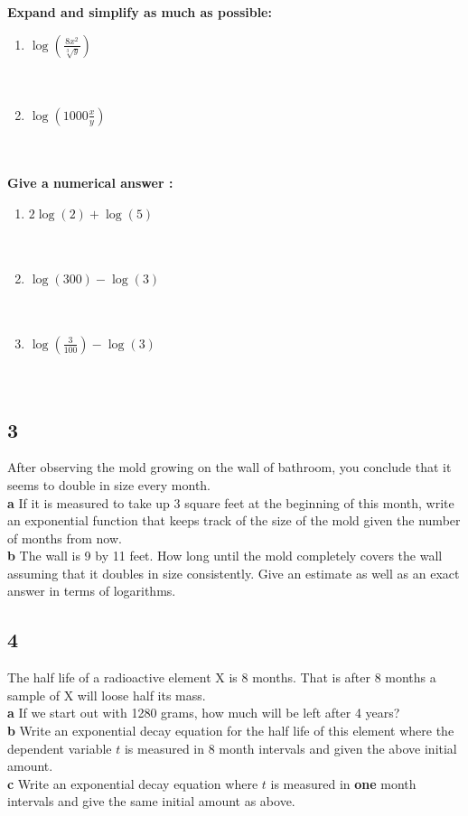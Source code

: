 \documentclass[11pt]{amsart}
\begin{document}
{\bf Expand and simplify as much as possible:} 
\begin{enumerate}[a]
\item $\displaystyle \log \left(\frac{8x^2}{\sqrt[3]{y}}\right) $\\ \\ \\
\item $\log(1000\frac{x}{y}) $ \\ \\ \\
\end{enumerate}

{\bf Give a numerical answer : } 
\begin{enumerate}[a]
\item $2\log(2) + \log(5) $\\ \\ \\
\item $\log(300) - \log( 3) $ \\ \\ \\ 
\item $\log(\frac{3}{100}) - \log(3) $ \\ \\ \\ 
\end{enumerate}




\newpage
\subsection*{3} %
After observing the mold growing on the wall of bathroom, you conclude that it seems to double in size every month.  \\
{\bf a} If it is measured to take up 3 square feet at the beginning of this month, write an exponential function that keeps track
of the size of the mold given the number of months from now. \\
{\bf b} The wall is 9 by 11 feet.  How long until the mold completely covers the wall assuming that it doubles in size consistently. 
Give an estimate as well as an exact answer in terms of logarithms. 
\vspace{7cm}
\newpage
\subsection*{4} %
The half life of a radioactive element X is 8 months. That is after 8 months a sample of X will loose half its mass.\\
{\bf a} If we start out with 1280 grams, how much will be left after 4 years? \\
{\bf b} Write an exponential decay equation for the half life of this element where the dependent variable $t$ is measured in 8 month intervals and given the above
initial amount. \\
{\bf c} Write an exponential decay equation where $t$ is measured in {\bf one} month intervals and give the same initial amount as above. 
\end{document}
